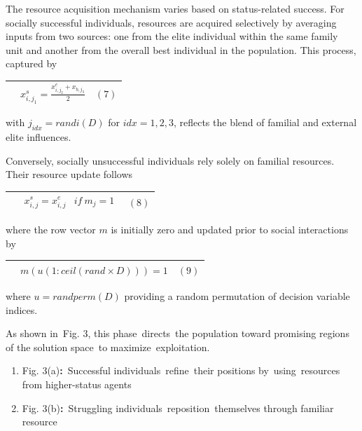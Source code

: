 \documentclass{article} %
\begin{document}
The resource acquisition mechanism varies based on status-related success. For socially successful individuals, resources are acquired selectively by averaging inputs from two sources: one from the elite individual within the same family unit and another from the overall best individual in the population. This process, captured by

\begin{tabular}{|p{0.4in}|p{3.1in}|p{0.4in}|} \hline 
 & $x^s_{i,j_1}=\frac{x^e_{i,j_2}+x_{b,j_3}}{2}$ & $\left(\mathrm{7}\right)$ \\ \hline 
\end{tabular}

with $j_{idx}=randi\left(D\right)$ for $idx=1,2,3$, reflects the blend of familial and external elite influences.

Conversely, socially unsuccessful individuals rely solely on familial resources. Their resource update follows

\begin{tabular}{|p{0.4in}|p{3.1in}|p{0.4in}|} \hline 
 & $ \begin{array}{cc}
x^s_{i,j}=x^e_{i,j} & if\ m_j=1 \end{array}
$ & $\left(\mathrm{8}\right)$ \\ \hline 
\end{tabular}

where the row vector $m$ is initially zero and updated prior to social interactions by

\begin{tabular}{|p{0.4in}|p{3.1in}|p{0.4in}|} \hline 
 & $m\left(u\left(1:ceil\left(rand\times D\right)\right)\right)=1$ & $\left(\mathrm{9}\right)$ \\ \hline 
\end{tabular}

where $u=randperm(D)$ providing a random permutation of decision variable indices.

As shown in~Fig. 3, this phase~directs~the population toward promising regions of the solution space~to maximize~exploitation.

\begin{enumerate}
\item  Fig. 3(a)\textbf{:}~Successful individuals~refine~their positions by~using~resources from higher-status agents

\item  Fig. 3(b)\textbf{:}~Struggling individuals~reposition~themselves through familiar resource 
\end{enumerate}
\end{document}

